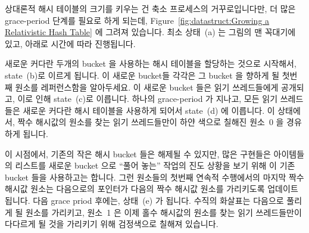 상대론적 해시 테이블의 크기를 키우는 건 축소 프로세스의 거꾸로입니다만, 더 많은
grace-period 단계를 필요로 하게 되는데,
Figure~\ref{fig:datastruct:Growing a Relativistic Hash Table} 에 그려져
있습니다.
최소 상태~(a) 는 그림의 맨 꼭대기에 있고, 아래로 시간에 따라 진행됩니다.

새로운 커다란 두개의 bucket 을 사용하는 해시 테이블을 할당하는 것으로 시작해서,
state~(b)로 이르게 됩니다.
이 새로운 bucket들 각각은 그 bucket 을 향하게 될 첫번째 원소를 레퍼런스함을
알아두세요.
이 새로운 bucket 들은 읽기 쓰레드들에게 공개되고, 이로 인해 state~(c)로
이릅니다.
하나의 grace-period 가 지나고, 모든 읽기 쓰레드들은 새로운 커다란 해시 테이블을
사용하게 되어서 state~(d) 에 이릅니다.
이 상태에서, 짝수 해시값의 원소를 찾는 읽기 쓰레드들만이 하얀 색으로 칠해진
원소~0 을 경유하게 됩니다.

이 시점에서, 기존의 작은 해시 bucket 들은 해제될 수 있지만, 많은 구현들은
아이템들의 리스트를 새로운 bucket 으로 ``풀어 놓는'' 작업의 진도 상황을 보기
위해 이 기존 bucket 들을 사용하고는 합니다.
그런 원소들의 첫번째 연속적 수행에서의 마지막 짝수 해시값 원소는 다음으로의
포인터가 다음의 짝수 해시값 원소를 가리키도록 업데이트 됩니다.
다음 grace priod 후에는, 상태~(e) 가 됩니다.
수직의 화살표는 다음으로 풀리게 될 원소를 가리키고, 원소~1 은 이제 홀수
해시값의 원소를 찾는 읽기 쓰레드들만이 다다르게 될 것을 가리키기 위해
검정색으로 칠해져 있습니다.

